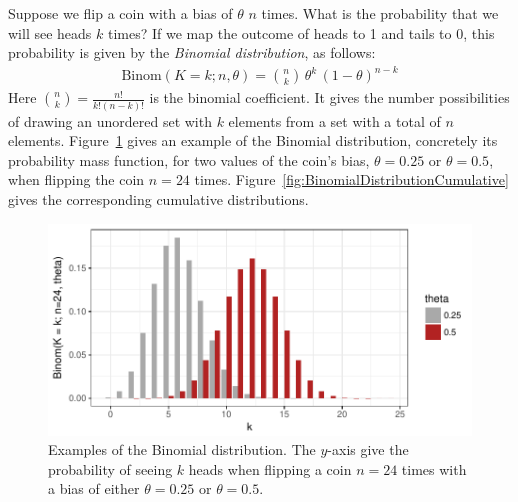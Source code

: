 \documentclass[nobib,nofonts]{tufte-handout}
\renewcommand{\markdef}[1]{\emph{#1}}
\begin{document}
\begin{example}
  Suppose we flip a coin with a bias of $\theta$ $n$ times. What is the probability that we
  will see heads $k$ times? If we map the outcome of heads to 1 and tails to 0, this
  probability is given by the \markdef{Binomial distribution}, as follows:
  \begin{align*}
    \text{Binom}(K = k ; n, \theta) = \binom{n}{k} \,  \theta^{k} \, (1-\theta)^{n-k}
  \end{align*}
  Here $\binom{n}{k} = \frac{n!}{k!(n-k)!}$ is the binomial coefficient. It gives the number
  possibilities of drawing an unordered set with $k$ elements from a set with a total of $n$
  elements. Figure~\ref{fig:BinomialDistribution} gives an example of the Binomial
  distribution, concretely its probability mass function, for two values of the coin's bias,
  $\theta = 0.25$ or $\theta = 0.5$, when flipping the coin $n=24$
  times. Figure~\ref{fig:BinomialDistributionCumulative} gives the corresponding cumulative
  distributions.

\begin{figure}
  \centering
  \includegraphics[width=\textwidth]{00-pics/05_00_binomial-distribution.pdf}
  \caption{Examples of the Binomial distribution. The $y$-axis give the probability of seeing
    $k$ heads when flipping a coin $n=24$ times with a bias of either $\theta = 0.25$ or
    $\theta = 0.5$.}
  \label{fig:BinomialDistribution}
\end{figure}


\end{example}
\end{document}
